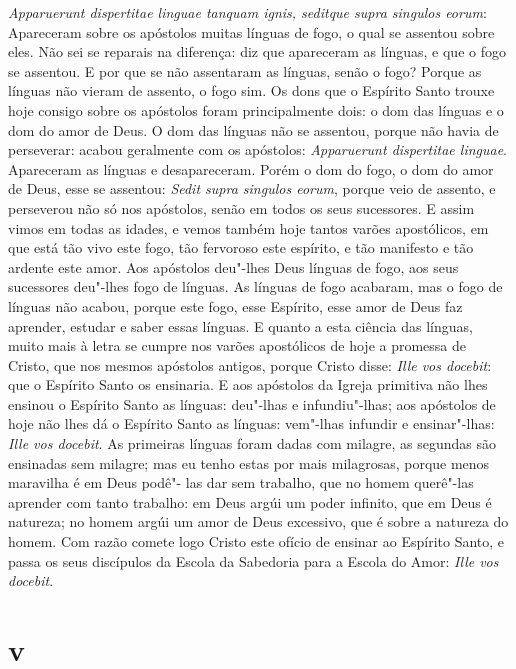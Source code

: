 \emph{Apparuerunt dispertitae linguae tanquam ignis, seditque supra
singulos eorum}: Apareceram sobre os apóstolos muitas línguas %
de fogo, o qual se assentou sobre eles. Não sei se reparais na
diferença: diz que apareceram as línguas, e que o fogo se assentou. E
por que se não assentaram as línguas, senão o fogo? Porque as línguas
não vieram de assento, o fogo sim. Os dons que o Espírito Santo trouxe
hoje consigo sobre os apóstolos foram principalmente dois: o dom das
línguas e o dom do amor de Deus. O dom das línguas não se assentou,
porque não havia de perseverar: acabou geralmente com os apóstolos:
\emph{Apparuerunt dispertitae linguae}. Apareceram as línguas e
desapareceram. Porém o dom do fogo, o dom do amor de Deus, esse se
assentou: \emph{Sedit supra singulos eorum}, porque veio de assento, e
perseverou não só nos apóstolos, senão em todos os seus sucessores. E
assim vimos em todas as idades, e vemos também hoje tantos varões
apostólicos, em que está tão vivo este fogo, tão fervoroso este
espírito, e tão manifesto e tão ardente este amor. Aos apóstolos
deu"-lhes Deus línguas de fogo, aos seus sucessores deu"-lhes fogo de
línguas. As línguas de fogo acabaram, mas o fogo de línguas não acabou,
porque este fogo, esse Espírito, esse amor de Deus faz aprender, estudar
e saber essas línguas. E quanto a esta ciência das línguas, muito mais à
letra se cumpre nos varões apostólicos de hoje a promessa de Cristo, que
nos mesmos apóstolos antigos, porque Cristo disse: \emph{Ille vos
docebit}: que o Espírito Santo os ensinaria. E aos apóstolos da Igreja
primitiva não lhes ensinou o Espírito Santo as línguas: deu"-lhas e
infundiu"-lhas; aos apóstolos de hoje não lhes dá o Espírito Santo as
línguas: vem"-lhas infundir e ensinar"-lhas: \emph{Ille vos docebit}. As
primeiras
línguas foram dadas com milagre, as segundas são ensinadas sem milagre;
mas eu tenho estas por mais milagrosas, porque menos maravilha é em Deus
podê"- las dar sem trabalho, que no homem querê"-las aprender com tanto
trabalho: em Deus argúi um poder infinito, que em Deus é natureza; no
homem argúi um amor de Deus excessivo, que é sobre a natureza do homem.
Com razão comete logo Cristo este ofício de ensinar ao Espírito Santo, e
passa os seus discípulos da Escola da Sabedoria para a Escola do Amor:
\emph{Ille vos docebit}.

\section{v}


